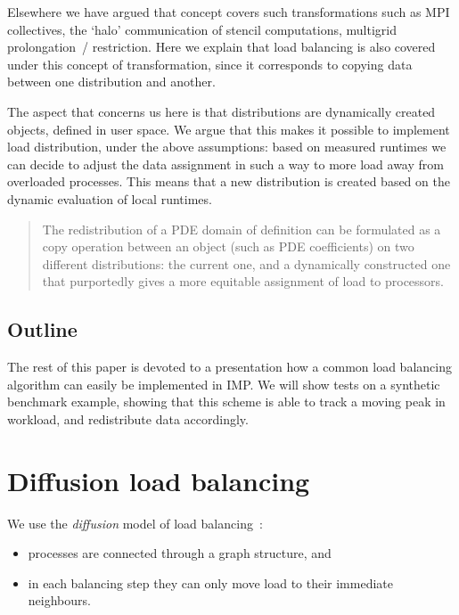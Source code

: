 \documentclass[11pt,fleqn]{article}
\begin{document}
Elsewhere we have argued that concept covers such transformations
such as MPI collectives, the `halo' communication of stencil computations,
multigrid prolongation~/ restriction. Here we explain that load balancing
is also covered under this concept of transformation, since it
corresponds to copying data between one distribution and another.

The aspect that concerns us
here is that distributions are dynamically created objects, defined in
user space. We argue that this makes it possible to implement
load distribution, under the above assumptions: based on measured
runtimes we can decide to adjust the data assignment in such a way to
more load away from overloaded processes. This means that a new
distribution is created based on the dynamic evaluation of local runtimes.

\begin{quotation}
  The redistribution of a \ac{PDE} domain of definition can be
  formulated as a copy operation between an object (such as \ac{PDE}
  coefficients) on two different distributions: the current one, and a
  dynamically constructed one that purportedly gives a more equitable
  assignment of load to processors.
\end{quotation}

\subsection{Outline}

The rest of this paper is devoted to a presentation how a common load
balancing algorithm can easily be implemented in \ac{IMP}. We will
show tests on a synthetic benchmark example, showing that this scheme
is able to track a moving peak in workload, and redistribute data
accordingly.

\section{Diffusion load balancing}

We use the
\emph{diffusion}
model of load balancing~\cite{Cybenko:1989:balancing,HuBlake:diffusion1999}:
\begin{itemize}
\item processes are connected through a graph structure, and
\item in each balancing step they can only move load to their
  immediate neighbours.
\end{itemize}
\end{document}
